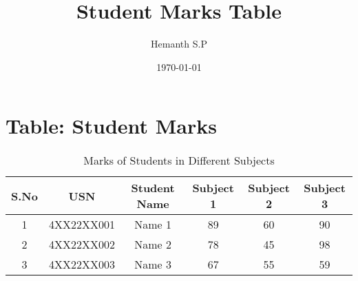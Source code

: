 \documentclass[a4paper,12pt]{article}
\begin{document}
\title{Student Marks Table}
\author{Hemanth S.P} %
\date{\today}
\maketitle
\section*{Table: Student Marks}
\begin{table}[h!]
\centering
\begin{tabular}{|c|c|c|c|c|c|}
\hline
\textbf{S.No} & \textbf{USN} & \textbf{Student Name} & \textbf{Subject 1} & \textbf{Subject 2} & \textbf{Subject 3} \\ \hline
1 & 4XX22XX001 & Name 1 & 89 & 60 & 90 \\ \hline
2 & 4XX22XX002 & Name 2 & 78 & 45 & 98 \\ \hline
3 & 4XX22XX003 & Name 3 & 67 & 55 & 59 \\ \hline
\end{tabular}
\caption{Marks of Students in Different Subjects}
\end{table}
\end{document}
